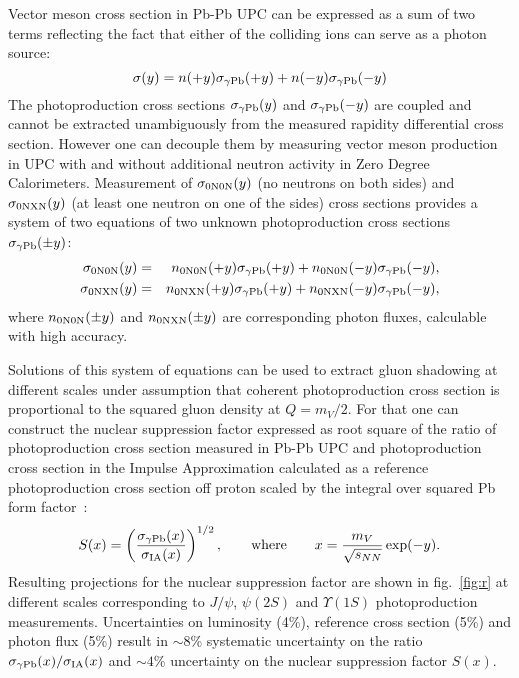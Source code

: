 \documentclass[../report.tex]{subfiles}
\begin{document}
Vector meson cross section in Pb-Pb UPC can be expressed as a sum of two terms reflecting the fact that either of the colliding ions can serve as a photon source:
\begin{equation}
\sigma(y) = n(+y) \sigma_{\rm \gamma Pb}(+y) + n(-y) \sigma_{\rm \gamma Pb}(-y)
\end{equation}
The photoproduction cross sections $\sigma_{\rm \gamma Pb}(y)$ and $\sigma_{\rm \gamma Pb}(-y)$ are coupled and cannot be extracted unambiguously from the measured rapidity differential cross section. However one can decouple them by measuring vector meson production in UPC with and without additional neutron activity in Zero Degree Calorimeters. Measurement of $\sigma_{\rm 0N0N}(y)$ (no neutrons on both sides) and $\sigma_{\rm 0NXN}(y)$ (at least one neutron on one of the sides) cross sections provides a system of two equations of two unknown photoproduction cross sections $\sigma_{\rm \gamma Pb}(\pm y)$:
\begin{eqnarray}
\sigma_{\rm 0N0N}(y) &=& n_{\rm 0N0N}(+y) \sigma_{\rm \gamma Pb}(+y) + n_{\rm 0N0N}(-y) \sigma_{\rm \gamma Pb}(-y), \\
\sigma_{\rm 0NXN}(y) &=& n_{\rm 0NXN}(+y) \sigma_{\rm \gamma Pb}(+y) + n_{\rm 0NXN}(-y) \sigma_{\rm \gamma Pb}(-y),
\end{eqnarray}
where $n_{\rm 0N0N}(\pm y)$ and $n_{\rm 0NXN}(\pm y)$ are corresponding photon fluxes, calculable with high accuracy.

Solutions of this system of equations can be used to extract gluon shadowing at different scales under assumption that coherent photoproduction cross section is proportional to the squared gluon density at $Q = m_{V}/2$. For that  one can construct the nuclear suppression factor expressed as root square of the ratio of photoproduction cross section measured in Pb-Pb UPC and photoproduction cross section in the Impulse Approximation calculated as a reference photoproduction cross section off proton scaled by the integral over squared Pb form factor~\cite{Guzey:2013xba}:
\begin{equation}
S (x) = \left(\frac{\sigma_{\rm \gamma Pb}(x)}{\sigma_{\rm IA}(x)}\right)^{1/2}, \qquad {\rm where}\qquad x  = \frac{m_{V}}{\sqrt{s_{NN}}}\exp(-y).
\end{equation}
Resulting projections for the nuclear suppression factor are shown in fig.~\ref{fig:r} at different scales corresponding to $J/\psi$, $\psi(2S)$ and $\Upsilon(1S)$ photoproduction measurements. Uncertainties on luminosity (4\%), reference cross section (5\%) and photon flux (5\%) result in $\sim8$\% systematic uncertainty on the ratio $\sigma_{\rm \gamma Pb}(x)/\sigma_{\rm IA}(x)$ and $\sim 4$\% uncertainty on the nuclear suppression factor $S (x)$.
\end{document}
